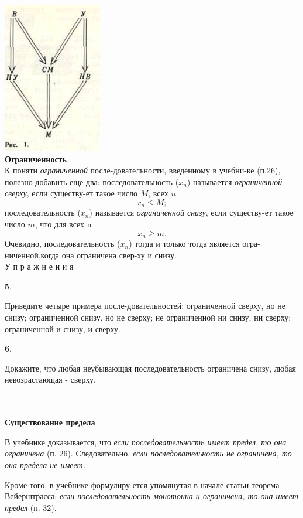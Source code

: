 \begin{minipage}{.34\textwidth}
    \includegraphics[width=140 pt]{images/2.png}
    \\
    \noindent
    \textbf{Ограниченность}
    \\
    К поняти \textit{ограниченной}
    после-довательности, введенному в учебни-ке (п.26), полезно добавить еще два: последовательность (\(x_n\)) называется \textit{ограниченной сверху}, если существу-ет такое число \(M\), всех \(n\)
    \[x_n \leq M;\]
    последовательность (\(x_n\)) называется \textit{ограниченной снизу}, если существу-ет такое число \(m\), что для всех n
    \[x_n \geq m.\]
    Очевидно, последовательность (\(x_n\)) тогда и только тогда является огра-ниченной,когда она ограничена свер-ху и снизу.
    \\ 
    
    \hspace{0.5cm}У п р а ж н е н и я

    \hspace{0.5cm}\textbf{5}. 
    \begin{tiny}
    Приведите четыре примера после-довательностей: ограниченной сверху, но не снизу; ограниченной снизу, но не сверху; не ограниченной ни снизу, ни сверху; ограниченной и снизу, и сверху.
    \end{tiny}
    
    \hspace{0.5cm}\textbf{6}. 
    \begin{tiny}
    Докажите, что любая неубывающая последовательность ограничена снизу, любая невозрастающая - сверху.
    \end{tiny}
    \\
    \\
    \textbf{Существование предела}
    
    \hspace{0.5cm}В учебнике доказывается, что \textit{если последовательность имеет предел, то она ограничена} (п. 26). Следовательно, \textit{если последовательность не ограничена, то она предела не имеет.}

    \hspace{0.5cm}Кроме того, в учебнике формулиру-ется упомянутая в начале статьи теорема Вейерштрасса: \textit{если последовательность монотонна и ограничена, то она имеет предел} (п. 32).

\end{minipage}
